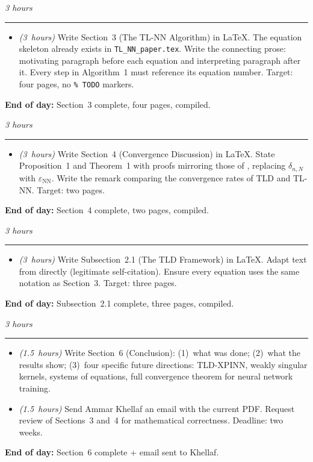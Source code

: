 \documentclass[12pt,a4paper]{article}
\newcommand{\hrs}[1]{\textit{\color{darkgray}(#1~hours)}}
\newcommand{\dayheading}[2]{%
  \vspace{0.3em}
  \noindent{\bfseries\color{darkblue}Day~#1}%
  \hfill{\small\color{darkgray}\textit{#2}}%
  \\[-0.4em]{\color{midgray}\rule{\linewidth}{0.4pt}}%
  \vspace{0.1em}
}
\begin{document}
\begin{tcolorbox}[daystyle]
\dayheading{18}{3 hours}
\begin{itemize}[leftmargin=1.8em,itemsep=3pt]
  \item[\color{midblue}$\bullet$]
    \hrs{3} Write Section~3 (The TL-NN Algorithm) in
    \LaTeX. The equation skeleton already exists in
    \texttt{TL\_NN\_paper.tex}. Write the connecting
    prose: motivating paragraph before each equation and
    interpreting paragraph after it. Every step in
    Algorithm~1 must reference its equation number.
    Target: four pages, no \texttt{\%~TODO} markers.
\end{itemize}
\noindent\textbf{End of day:}
Section~3 complete, four pages, compiled.
\end{tcolorbox}

\begin{tcolorbox}[daystyle]
\dayheading{19}{3 hours}
\begin{itemize}[leftmargin=1.8em,itemsep=3pt]
  \item[\color{midblue}$\bullet$]
    \hrs{3} Write Section~4 (Convergence Discussion) in
    \LaTeX. State Proposition~1 and Theorem~1 with
    proofs mirroring those of \cite{sedka2025}, replacing
    $\delta_{n,N}$ with $\varepsilon_{\mathrm{NN}}$.
    Write the remark comparing the convergence rates of
    TLD and TL-NN. Target: two pages.
\end{itemize}
\noindent\textbf{End of day:}
Section~4 complete, two pages, compiled.
\end{tcolorbox}

\begin{tcolorbox}[daystyle]
\dayheading{20}{3 hours}
\begin{itemize}[leftmargin=1.8em,itemsep=3pt]
  \item[\color{midblue}$\bullet$]
    \hrs{3} Write Subsection~2.1 (The TLD Framework) in
    \LaTeX. Adapt text from \cite{sedka2025} directly
    (legitimate self-citation). Ensure every equation
    uses the same notation as Section~3.
    Target: three pages.
\end{itemize}
\noindent\textbf{End of day:}
Subsection~2.1 complete, three pages, compiled.
\end{tcolorbox}

\begin{tcolorbox}[daystyle]
\dayheading{21}{3 hours}
\begin{itemize}[leftmargin=1.8em,itemsep=3pt]
  \item[\color{midblue}$\bullet$]
    \hrs{1.5} Write Section~6 (Conclusion): (1)~what was
    done; (2)~what the results show; (3)~four specific
    future directions: TLD-XPINN, weakly singular kernels,
    systems of equations, full convergence theorem for
    neural network training.
  \item[\color{midblue}$\bullet$]
    \hrs{1.5} Send Ammar Khellaf an email with the current
    PDF. Request review of Sections~3 and~4 for
    mathematical correctness. Deadline: two weeks.
\end{itemize}
\noindent\textbf{End of day:}
Section~6 complete + email sent to Khellaf.
\end{tcolorbox}
\end{document}
